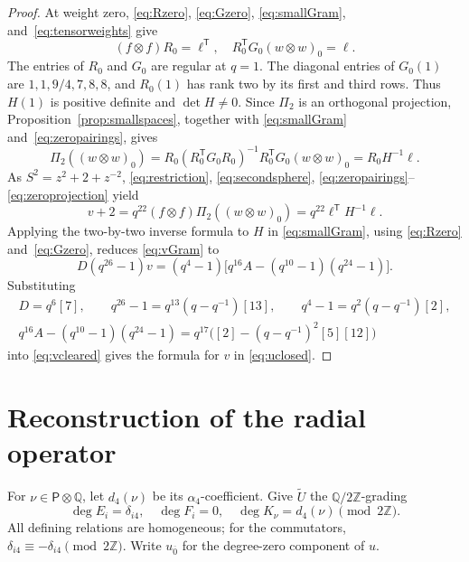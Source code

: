 \documentclass[12pt,reqno]{amsart}
\theoremstyle{plain}
\theoremstyle{definition}
\numberwithin{equation}{section}
\newcommand{\tens}{\otimes}
\begin{document}
\begin{proof}
	At weight zero, \eqref{eq:Rzero}, \eqref{eq:Gzero},
	\eqref{eq:smallGram}, and~\eqref{eq:tensorweights} give
	\begin{equation}\label{eq:zeropairings}
		(f\tens f)R_0=\boldsymbol{\ell}^{\mathsf T},\quad
		R_0^{\mathsf T}G_0(w\tens w)_0=\boldsymbol{\ell}.
	\end{equation}
	The entries of $R_0$ and $G_0$ are regular at $q=1$.
	The diagonal entries of $G_0(1)$ are $1,1,9/4,7,8,8$,
	and $R_0(1)$ has rank two by its first and third rows.
	Thus $H(1)$ is positive definite and $\det H\ne0$.
	Since $\Pi_2$ is an orthogonal projection,
	Proposition~\ref{prop:smallspaces}, together with
	\eqref{eq:smallGram} and~\eqref{eq:zeropairings}, gives
	\begin{equation}\label{eq:zeroprojection}
		\Pi_2((w\tens w)_0)
		=R_0(R_0^{\mathsf T}G_0R_0)^{-1}
		R_0^{\mathsf T}G_0(w\tens w)_0
		=R_0H^{-1}\boldsymbol{\ell}.
	\end{equation}
	As $S^2=z^2+2+z^{-2}$, \eqref{eq:restriction},
	\eqref{eq:secondsphere}, \eqref{eq:zeropairings}--\eqref{eq:zeroprojection} yield
	\begin{equation}\label{eq:vGram}
		v+2=q^{22}(f\tens f)\Pi_2((w\tens w)_0)
		=q^{22}\boldsymbol{\ell}^{\mathsf T}H^{-1}\boldsymbol{\ell}.
	\end{equation}
	Applying the two-by-two inverse formula to $H$ in
	\eqref{eq:smallGram}, using \eqref{eq:Rzero} and~\eqref{eq:Gzero},
	reduces \eqref{eq:vGram} to
	\begin{equation}\label{eq:vcleared}
		D(q^{26}-1)v
		=(q^4-1)\bigl[q^{16}A-(q^{10}-1)(q^{24}-1)\bigr].
	\end{equation}
	Substituting
	\[
	\begin{gathered}
		D=q^6[7],\qquad
		q^{26}-1=q^{13}(q-q^{-1})[13],\qquad
		q^4-1=q^2(q-q^{-1})[2],\\
		q^{16}A-(q^{10}-1)(q^{24}-1)
		=q^{17}\bigl([2]-(q-q^{-1})^2[5][12]\bigr)
	\end{gathered}
	\]
	into \eqref{eq:vcleared} gives the formula for $v$ in
	\eqref{eq:uclosed}.
\end{proof}


\section{Reconstruction of the radial operator}
\label{sec:reconstruction}

For $\nu\in\mathsf P\otimes\mathbb Q$, let $d_4(\nu)$ be its
$\alpha_4$-coefficient. Give $\widetilde U$ the
$\mathbb Q/2\mathbb Z$-grading
\[
\deg E_i=\delta_{i4},\quad
\deg F_i=0,\quad
\deg K_\nu=d_4(\nu)\!\!\!\!\!\pmod{2\mathbb Z}.
\]
All defining relations are homogeneous; for the commutators,
$\delta_{i4}\equiv-\delta_{i4}\!\pmod{2\mathbb Z}$.
Write $u_{\overline0}$ for the degree-zero component of $u$.
\end{document}

